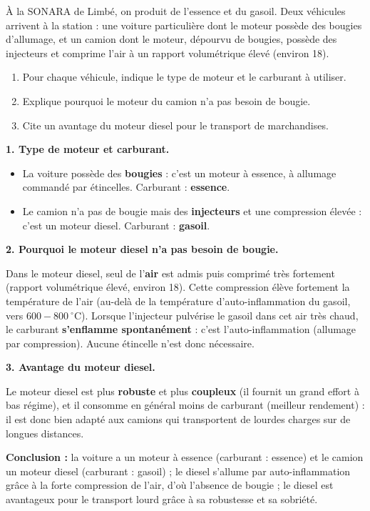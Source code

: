 \documentclass[11pt]{article}
\newcommand{\cle}[1]{{\popxbold\color{popdark}#1}}
\begin{document}
\begin{exoresolu}
À la SONARA de Limbé, on produit de l'essence et du gasoil. Deux véhicules arrivent à la station : une voiture particulière dont le moteur possède des bougies d'allumage, et un camion dont le moteur, dépourvu de bougies, possède des injecteurs et comprime l'air à un rapport volumétrique élevé (environ 18).
\begin{enumerate}
\item Pour chaque véhicule, indique le type de moteur et le carburant à utiliser.
\item Explique pourquoi le moteur du camion n'a pas besoin de bougie.
\item Cite un avantage du moteur diesel pour le transport de marchandises.
\end{enumerate}
\tcblower
\textbf{1. Type de moteur et carburant.}
\begin{itemize}
\item La voiture possède des \textbf{bougies} : c'est un \cle{moteur à essence}, à allumage commandé par étincelles. Carburant : \textbf{essence}.
\item Le camion n'a pas de bougie mais des \textbf{injecteurs} et une compression élevée : c'est un \cle{moteur diesel}. Carburant : \textbf{gasoil}.
\end{itemize}

\textbf{2. Pourquoi le moteur diesel n'a pas besoin de bougie.}

Dans le moteur diesel, seul de l'\textbf{air} est admis puis comprimé très fortement (rapport volumétrique élevé, environ 18). Cette compression élève fortement la température de l'air (au-delà de la température d'auto-inflammation du gasoil, vers $600-800\ {}^\circ\mathrm{C}$). Lorsque l'injecteur pulvérise le gasoil dans cet air très chaud, le carburant \textbf{s'enflamme spontanément} : c'est l'\cle{auto-inflammation} (allumage par compression). Aucune étincelle n'est donc nécessaire.

\textbf{3. Avantage du moteur diesel.}

Le moteur diesel est plus \textbf{robuste} et plus \textbf{coupleux} (il fournit un grand effort à bas régime), et il consomme en général moins de carburant (meilleur rendement) : il est donc bien adapté aux camions qui transportent de lourdes charges sur de longues distances.

\textbf{Conclusion :} la voiture a un moteur à essence (carburant : essence) et le camion un moteur diesel (carburant : gasoil) ; le diesel s'allume par auto-inflammation grâce à la forte compression de l'air, d'où l'absence de bougie ; le diesel est avantageux pour le transport lourd grâce à sa robustesse et sa sobriété.
\end{exoresolu}
\end{document}
